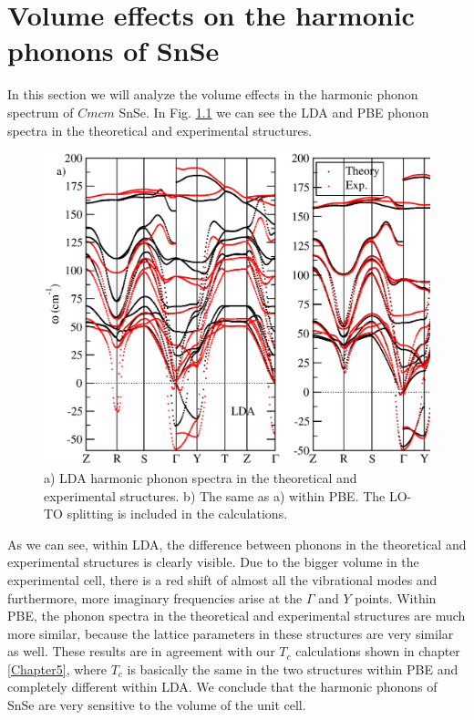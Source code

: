 
\chapter{Volume effects on the harmonic phonons of SnSe} %

\label{volume-effects} %

In this section we will analyze the volume effects in the harmonic phonon spectrum of $Cmcm$ SnSe. In 
Fig. \ref{harmonic-volume} we can see the LDA and
PBE phonon spectra in the theoretical and experimental structures.
\begin{figure}[th]
\begin{center}
\includegraphics[width=0.8\linewidth]{Figures/phonon-exp-dft.eps}
\caption[Harmonic phonons of $Cmcm$ SnSe with different volumes.]{a) LDA harmonic phonon spectra in the theoretical 
and experimental structures. b) The same as a) within PBE. The LO-TO splitting is included in the calculations.}
\label{harmonic-volume}
\end{center}
\end{figure}
As we can see, within LDA, the difference between phonons in the theoretical and experimental structures is clearly 
visible. Due to the bigger volume in the experimental cell, there is a red shift of almost all the vibrational modes 
and furthermore, more imaginary frequencies arise at the $\Gamma$ and $Y$ points. Within PBE, the phonon spectra in 
the theoretical and experimental structures are much more similar, because the lattice parameters in these structures 
are very similar as well. These results are in agreement with our $T_{c}$ calculations shown in 
chapter \ref{Chapter5}, where $T_{c}$ is basically the same in the two structures within PBE and completely different 
within LDA. We conclude that the harmonic phonons of SnSe are very sensitive to the volume of the unit cell. \\

